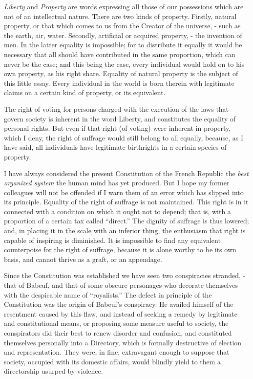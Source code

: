 \textit{Liberty} and \textit{Property} are words expressing all those of our possessions which are not of an intellectual nature. There are two kinds of property. Firstly, natural property, or that which comes to us from the Creator of the universe, - such as the earth, air, water. Secondly, artificial or acquired property, - the invention of men. In the latter equality is impossible; for to distribute it equally it would be necessary that all should have contributed in the same proportion, which can never be the case; and this being the case, every individual would hold on to his own property, as his right share. Equality of natural property is the subject of this little essay. Every individual in the world is born therein with legitimate claims on a certain kind of property, or its equivalent.\par

The right of voting for persons charged with the execution of the laws that govern society is inherent in the word Liberty, and constitutes the equality of personal rights. But even if that right (of voting) were inherent in property, which I deny, the right of suffrage would still belong to all equally, because, as I have said, all individuals have legitimate birthrights in a certain species of property.\par

I have always considered the present Constitution of the French Republic the \textit{best organized system} the human mind has yet produced. But I hope my former colleagues will not be offended if I warn them of an error which has slipped into its principle. Equality of the right of suffrage is not maintained. This right is in it connected with a condition on which it ought not to depend; that is, with a proportion of a certain tax called “direct.” The dignity of suffrage is thus lowered; and, in placing it in the scale with an inferior thing, the enthusiasm that right is capable of inspiring is diminished. It is impossible to find any equivalent counterpoise for the right of suffrage, because it is alone worthy to be its own basis, and cannot thrive as a graft, or an appendage.\par

Since the Constitution was established we have seen two conspiracies stranded, - that of Babeuf, and that of some obscure personages who decorate themselves with the despicable name of “royalists.” The defect in principle of the Constitution was the origin of Babeuf’s conspiracy. He availed himself of the resentment caused by this flaw, and instead of seeking a remedy by legitimate and constitutional means, or proposing some measure useful to society, the conspirators did their best to renew disorder and confusion, and constituted themselves personally into a Directory, which is formally destructive of election and representation. They were, in fine, extravagant enough to suppose that society, occupied with its domestic affairs, would blindly yield to them a directorship usurped by violence.\par

